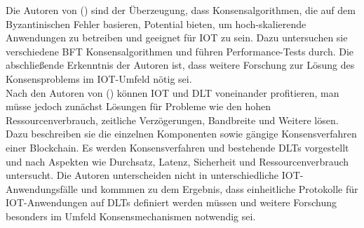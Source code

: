 Die Autoren \citeauthor{Eval2018} von  (\cite{Eval2018}) sind der Überzeugung, dass Konsensalgorithmen, die auf dem Byzantinischen Fehler basieren, Potential bieten, um hoch-skalierende Anwendungen zu betreiben und geeignet für \ac{IOT} zu sein. Dazu untersuchen sie verschiedene \ac{BFT} Konsensalgorithmen und führen Performance-Tests durch. Die abschließende Erkenntnis der Autoren ist, dass weitere Forschung zur Lösung des Konsensproblems im \ac{IOT}-Umfeld nötig sei.\\
Nach den Autoren \citeauthor{convergence2019} von  (\cite{convergence2019}) können \ac{IOT} und \ac{DLT} voneinander profitieren, man müsse jedoch zunächst Lösungen für Probleme wie den hohen Ressourcenverbrauch, zeitliche Verzögerungen, Bandbreite und Weitere lösen. Dazu beschreiben sie die einzelnen Komponenten sowie gängige Konsensverfahren einer Blockchain. Es werden Konsensverfahren und bestehende \ac{DLT}s vorgestellt und nach Aspekten wie Durchsatz, Latenz, Sicherheit und Ressourcenverbrauch untersucht. Die Autoren unterscheiden nicht in unterschiedliche \ac{IOT}-Anwendungsfälle und kommmen zu dem Ergebnis, dass
einheitliche Protokolle für \ac{IOT}-Anwendungen auf \ac{DLT}s definiert werden müssen und weitere Forschung besonders im Umfeld Konsensmechanismen notwendig sei.
